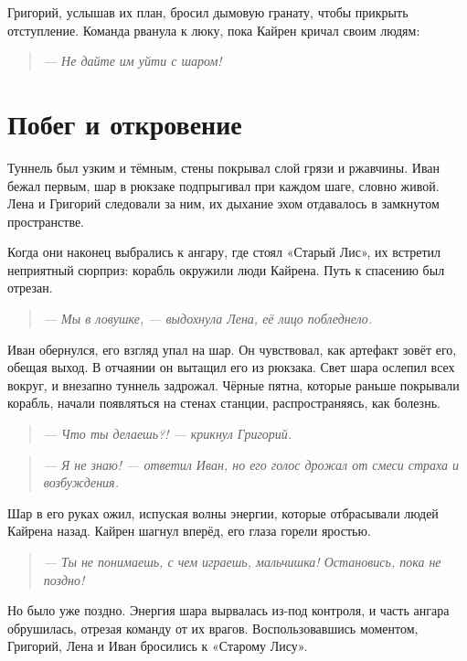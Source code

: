 \documentclass[12pt,a4paper]{book} %
\newenvironment{dialogue}{\begin{quote}\itshape}{\end{quote}}
\begin{document}
Григорий, услышав их план, бросил дымовую гранату, чтобы прикрыть отступление. Команда рванула к люку, пока Кайрен кричал своим людям:

\begin{dialogue}
--- Не дайте им уйти с шаром!
\end{dialogue}

\section*{Побег и откровение}

Туннель был узким и тёмным, стены покрывал слой грязи и ржавчины. Иван бежал первым, шар в рюкзаке подпрыгивал при каждом шаге, словно живой. Лена и Григорий следовали за ним, их дыхание эхом отдавалось в замкнутом пространстве.

Когда они наконец выбрались к ангару, где стоял «Старый Лис», их встретил неприятный сюрприз: корабль окружили люди Кайрена. Путь к спасению был отрезан.

\begin{dialogue}
--- Мы в ловушке, --- выдохнула Лена, её лицо побледнело.
\end{dialogue}

Иван обернулся, его взгляд упал на шар. Он чувствовал, как артефакт зовёт его, обещая выход. В отчаянии он вытащил его из рюкзака. Свет шара ослепил всех вокруг, и внезапно туннель задрожал. Чёрные пятна, которые раньше покрывали корабль, начали появляться на стенах станции, распространяясь, как болезнь.

\begin{dialogue}
--- Что ты делаешь?! --- крикнул Григорий.
\end{dialogue}

\begin{dialogue}
--- Я не знаю! --- ответил Иван, но его голос дрожал от смеси страха и возбуждения.
\end{dialogue}

Шар в его руках ожил, испуская волны энергии, которые отбрасывали людей Кайрена назад. Кайрен шагнул вперёд, его глаза горели яростью.

\begin{dialogue}
--- Ты не понимаешь, с чем играешь, мальчишка! Остановись, пока не поздно!
\end{dialogue}

Но было уже поздно. Энергия шара вырвалась из-под контроля, и часть ангара обрушилась, отрезая команду от их врагов. Воспользовавшись моментом, Григорий, Лена и Иван бросились к «Старому Лису».
\end{document}
